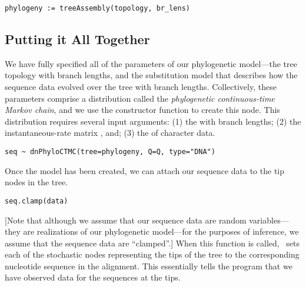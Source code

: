 {\tt \begin{snugshade*}
\begin{lstlisting}
phylogeny := treeAssembly(topology, br_lens)
\end{lstlisting}
\end{snugshade*}}



\subsection{Putting it All Together}

We have fully specified all of the parameters of our phylogenetic model---the tree topology with branch lengths, and the substitution model that describes how the sequence data evolved over the tree with branch lengths.  
Collectively, these parameters comprise a distribution called the \textit{phylogenetic continuous-time Markov chain}, and we use the  constructor function to create this node.
This distribution requires several input arguments: 
(1) the  with branch lengths; 
(2) the instantaneous-rate matrix , and; 
(3) the  of character data.
{\tt \begin{snugshade*}
\begin{lstlisting}
seq ~ dnPhyloCTMC(tree=phylogeny, Q=Q, type="DNA")
\end{lstlisting}
\end{snugshade*}}


Once the  model has been created, we can attach our sequence data to the tip nodes in the tree.
{\tt \begin{snugshade*}
\begin{lstlisting}
seq.clamp(data)
\end{lstlisting}
\end{snugshade*}}
[Note that although we assume that our sequence data are random variables---they are realizations of our phylogenetic model---for the purposes of inference, we assume that the sequence data are ``clamped''.]
When this function is called, \RevBayes~sets each of the stochastic nodes representing the tips of the tree to the corresponding nucleotide sequence in the alignment. 
This essentially tells the program that we have observed data for the sequences at the tips. 

